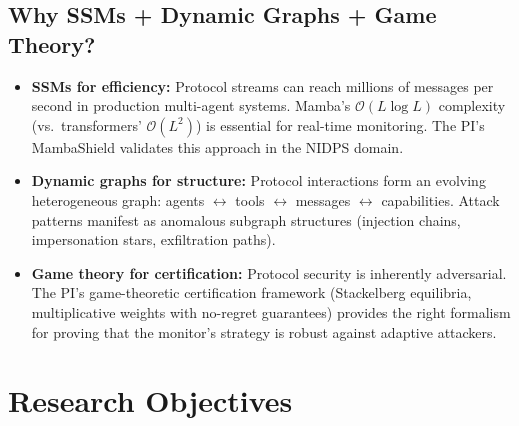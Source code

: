 \documentclass[12pt,a4paper]{article}
\newcommand{\calO}{\mathcal{O}}
\begin{document}
\subsection{Why SSMs + Dynamic Graphs + Game Theory?}

\begin{itemize}
    \item \textbf{SSMs for efficiency:} Protocol streams can reach millions of messages per second in production multi-agent systems. Mamba's $\calO(L \log L)$ complexity (vs.\ transformers' $\calO(L^2)$) is essential for real-time monitoring. The PI's MambaShield validates this approach in the NIDPS domain.
    
    \item \textbf{Dynamic graphs for structure:} Protocol interactions form an evolving heterogeneous graph: agents $\leftrightarrow$ tools $\leftrightarrow$ messages $\leftrightarrow$ capabilities. Attack patterns manifest as anomalous subgraph structures (injection chains, impersonation stars, exfiltration paths).
    
    \item \textbf{Game theory for certification:} Protocol security is inherently adversarial. The PI's game-theoretic certification framework (Stackelberg equilibria, multiplicative weights with no-regret guarantees) provides the right formalism for proving that the monitor's strategy is robust against adaptive attackers.
\end{itemize}

\section{Research Objectives}
\end{document}
